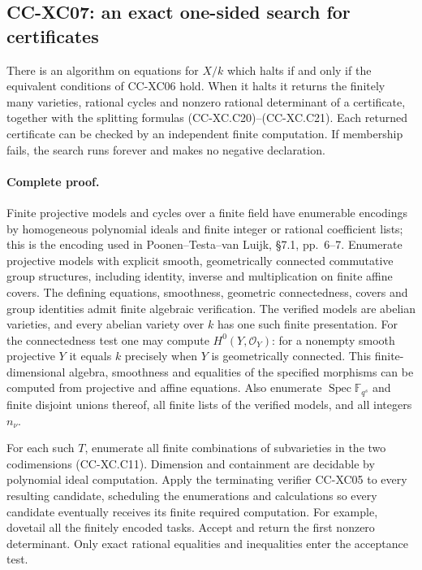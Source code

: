 \subsection{CC-XC07: an exact one-sided search for certificates}

There is an algorithm on equations for \(X/k\) which halts
if and only if the equivalent conditions of CC-XC06 hold.
When it halts it returns the finitely many varieties,
rational cycles and nonzero rational determinant of a
certificate, together with the splitting formulas
(CC-XC.C20)--(CC-XC.C21).  Each returned certificate can
be checked by an independent finite computation.
If membership fails, the search runs forever and makes
no negative declaration.

\paragraph{Complete proof.}
Finite projective models and cycles over a finite field
have enumerable encodings by homogeneous polynomial
ideals and finite integer or rational coefficient lists;
this is the encoding used in Poonen--Testa--van Luijk,
\S7.1, pp.~6--7.  Enumerate projective models with explicit
smooth, geometrically connected commutative group
structures, including identity, inverse and multiplication
on finite affine covers.  The defining equations,
smoothness, geometric connectedness, covers and group
identities admit finite algebraic verification.  The
verified models are abelian varieties, and every abelian
variety over \(k\) has one such finite presentation.
For the connectedness test one may compute
\(H^0(Y,\mathcal O_Y)\): for a nonempty smooth projective
\(Y\) it equals \(k\) precisely when \(Y\) is geometrically
connected.  This finite-dimensional algebra, smoothness
and equalities of the specified morphisms can be computed
from projective and affine equations.
Also enumerate \(\operatorname{Spec}\mathbb F_{q^s}\)
and finite disjoint unions thereof, all finite lists of
the verified models, and all integers \(n_\nu\).

For each such \(T\), enumerate all finite combinations of
subvarieties in the two codimensions (CC-XC.C11).
Dimension and containment are decidable by polynomial
ideal computation.  Apply the terminating verifier
CC-XC05 to every resulting candidate, scheduling the
enumerations and calculations so every candidate
eventually receives its finite required computation.
For example, dovetail all the finitely encoded tasks.
Accept and return the first nonzero determinant.
Only exact rational equalities and inequalities enter
the acceptance test.

